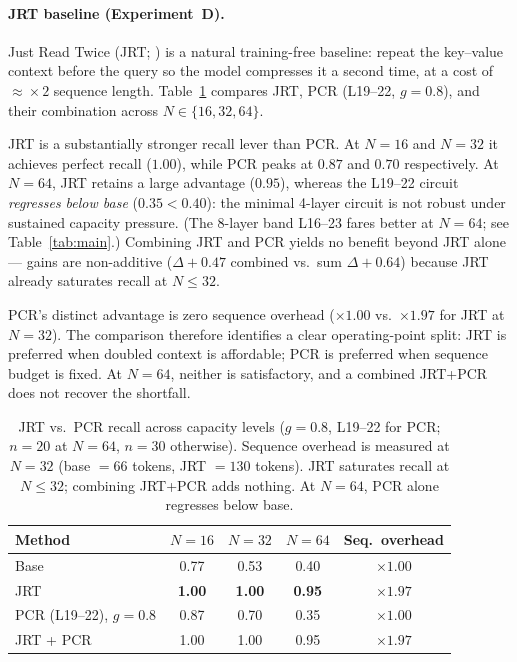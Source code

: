 \documentclass{article}
\begin{document}
\paragraph{JRT baseline (Experiment~D).}
Just Read Twice (JRT; \citealt{jrt}) is a natural training-free baseline: repeat the
key--value context before the query so the model compresses it a second time, at a
cost of $\approx\!\times\!2$ sequence length. Table~\ref{tab:jrt} compares JRT,
PCR (L19--22, $g{=}0.8$), and their combination across $N\in\{16,32,64\}$.

JRT is a substantially stronger recall lever than PCR. At $N{=}16$ and $N{=}32$
it achieves perfect recall ($1.00$), while PCR peaks at $0.87$ and $0.70$
respectively. At $N{=}64$, JRT retains a large advantage ($0.95$), whereas the
L19--22 circuit \emph{regresses below base} ($0.35 < 0.40$): the minimal 4-layer
circuit is not robust under sustained capacity pressure. (The 8-layer band
L16--23 fares better at $N{=}64$; see Table~\ref{tab:main}.) Combining JRT and PCR
yields no benefit beyond JRT alone --- gains are non-additive ($\Delta{+}0.47$
combined vs.\ sum $\Delta{+}0.64$) because JRT already saturates recall at
$N\le 32$.

PCR's distinct advantage is zero sequence overhead ($\times 1.00$ vs.\ $\times 1.97$
for JRT at $N{=}32$). The comparison therefore identifies a clear operating-point
split: JRT is preferred when doubled context is affordable; PCR is preferred when
sequence budget is fixed. At $N{=}64$, neither is satisfactory, and a combined
JRT+PCR does not recover the shortfall.

\begin{table}[t]
\centering
\caption{JRT vs.\ PCR recall across capacity levels ($g{=}0.8$, L19--22 for PCR;
$n{=}20$ at $N{=}64$, $n{=}30$ otherwise). Sequence overhead is measured at $N{=}32$
(base $=66$ tokens, JRT $=130$ tokens). JRT saturates recall at $N\le 32$;
combining JRT+PCR adds nothing. At $N{=}64$, PCR alone regresses below base.}
\label{tab:jrt}
\begin{tabular}{lcccc}
\toprule
Method & $N{=}16$ & $N{=}32$ & $N{=}64$ & Seq.\ overhead \\
\midrule
Base                      & 0.77 & 0.53 & 0.40 & $\times 1.00$ \\
JRT \citep{jrt}           & \textbf{1.00} & \textbf{1.00} & \textbf{0.95} & $\times 1.97$ \\
PCR (L19--22), $g{=}0.8$ & 0.87 & 0.70 & 0.35 & $\mathbf{\times 1.00}$ \\
JRT + PCR                 & 1.00 & 1.00 & 0.95 & $\times 1.97$ \\
\bottomrule
\end{tabular}
\end{table}
\end{document}
